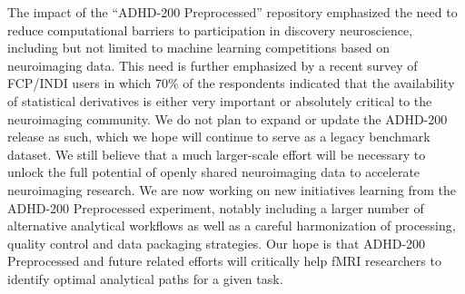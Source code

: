 \documentclass[preprint,12pt,3p]{elsarticle}
\begin{document}
\par 
The impact of the ``ADHD-200 Preprocessed'' repository emphasized the need to reduce computational barriers to participation in discovery neuroscience, including but not limited to machine learning competitions based on neuroimaging data. This need is further emphasized by a recent survey of FCP/INDI users in which 70\% of the respondents indicated that the availability of statistical derivatives is either very important or absolutely critical to the neuroimaging community. We do not plan to expand or update the ADHD-200 release as such, which we hope will continue to serve as a legacy benchmark dataset. We still believe that a much larger-scale effort will be necessary to unlock the full potential of openly shared neuroimaging data to accelerate neuroimaging research. We are now working on new initiatives learning from the ADHD-200 Preprocessed experiment, notably including a larger number of alternative analytical workflows as well as a careful harmonization of processing, quality control and data packaging strategies. Our hope is that ADHD-200 Preprocessed and future related efforts will critically help fMRI researchers to identify optimal analytical paths for a given task. 



% 
% 
% 
% 
% 
% 
% 
% 
% 
% 
% 
% 


\end{document}
